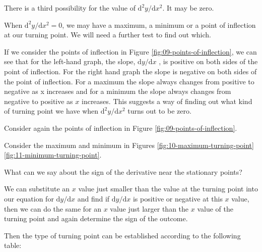 \documentclass[
  11pt,
  oneside]{book}
\newcommand{\slide}{}
\theoremstyle{definition}
\theoremstyle{definition}
\theoremstyle{definition}
\theoremstyle{definition}
\theoremstyle{remark}
\begin{document}
There is a third possibility for the value of \(\mathrm{d}^{2}y/\mathrm{d} x^2\). It may be zero.

When \(\mathrm{d}^{2}y/\mathrm{d} x^2=0\), we may have a maximum, a minimum or a point of inflection at our turning point. We will need a further test to find out which.

\begin{notslides}

If we consider the points of inflection in Figure \ref{fig:09-points-of-inflection}, we can see that for the left-hand graph, the slope, \(\mathrm{d}y/\mathrm{d} x\) , is positive on both sides of the point of inflection. For the right hand graph the slope is negative on both sides of the point of inflection. For a maximum the slope always changes from positive to negative as x increases and for a minimum the slope always changes from negative to positive as \(x\) increases. This suggests a way of finding out what kind of turning point we have when \(\mathrm{d}^{2}y/\mathrm{d} x^2\) turns out to be zero.

\end{notslides}

\begin{slidesonly}

Consider again the points of inflection in Figure \ref{fig:09-points-of-inflection}.

\vfill

Consider the maximum and minimum in Figures \ref{fig:10-maximum-turning-point} \ref{fig:11-minimum-turning-point}.

\vfill

What can we say about the sign of the derivative near the stationary points?

\end{slidesonly}

\slide

We can substitute an \(x\) value just smaller than the value at the turning point into our equation for \(\mathrm{d}y/\mathrm{d} x\) and find if \(\mathrm{d}y/\mathrm{d} x\) is positive or negative at this \(x\) value, then we can do the same for an \(x\) value just larger than the \(x\) value of the turning point and again determine the sign of the outcome.

\slide

Then the type of turning point can be established according to the following table:
\end{document}
